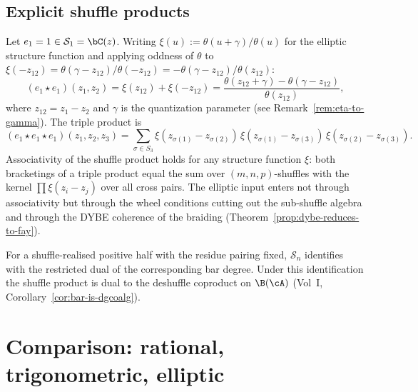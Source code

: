 \subsection{Explicit shuffle products}
\label{subsec:shuffle-explicit}

\begin{computation}\label{comp:shuffle-generators}
Let $e_1 = 1 \in \mathcal{S}_1 = \bC(z)$. Writing $\xi(u) := \theta(u+\gamma)/\theta(u)$ for the elliptic structure function and applying oddness of $\theta$ to $\xi(-z_{12}) = \theta(\gamma - z_{12})/\theta(-z_{12}) = -\theta(\gamma - z_{12})/\theta(z_{12})$:
\begin{equation}\label{eq:e1e1-result}
(e_1 \star e_1)(z_1, z_2)
= \xi(z_{12}) + \xi(-z_{12})
= \frac{\theta(z_{12}+\gamma) - \theta(\gamma - z_{12})}
{\theta(z_{12})},
\end{equation}
where $z_{12} = z_1 - z_2$ and $\gamma$ is the quantization parameter (see Remark~\ref{rem:eta-to-gamma}). The triple product is
\begin{equation}\label{eq:shuffle-e1e1e1}
(e_1 \star e_1 \star e_1)(z_1, z_2, z_3)
= \sum_{\sigma \in S_3}
\xi(z_{\sigma(1)} - z_{\sigma(2)})\,
\xi(z_{\sigma(1)} - z_{\sigma(3)})\,
\xi(z_{\sigma(2)} - z_{\sigma(3)}).
\end{equation}
Associativity of the shuffle product holds for any structure function $\xi$: both bracketings of a triple product equal the sum over $(m,n,p)$-shuffles with the kernel $\prod \xi(z_i - z_j)$ over all cross pairs. The elliptic input enters not through associativity but through the wheel conditions cutting out the sub-shuffle algebra and through the DYBE coherence of the braiding (Theorem~\ref{prop:dybe-reduces-to-fay}).
\end{computation}

\begin{remark}\label{rem:shuffle-bar}
For a shuffle-realised positive half with the residue pairing fixed,
$\mathcal{S}_n$ identifies with the restricted dual of the corresponding
bar degree. Under this identification the shuffle product is dual to the
deshuffle coproduct on $\B(\cA)$ (Vol~I, Corollary~\ref{cor:bar-is-dgcoalg}).
\end{remark}


\section{Comparison: rational, trigonometric, elliptic}
\label{sec:rat-trig-ell-comparison}

